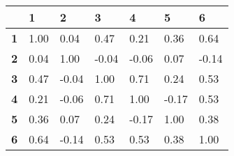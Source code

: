 \begin{tabular}{lllllll}

&\textbf{1}&\textbf{2}&\textbf{3}&\textbf{4}&\textbf{5}&\textbf{6}\\\hline
\textbf{1}&1.00&0.04&0.47&0.21&0.36&0.64\\
\textbf{2}&0.04&1.00&-0.04&-0.06&0.07&-0.14\\
\textbf{3}&0.47&-0.04&1.00&0.71&0.24&0.53\\
\textbf{4}&0.21&-0.06&0.71&1.00&-0.17&0.53\\
\textbf{5}&0.36&0.07&0.24&-0.17&1.00&0.38\\
\textbf{6}&0.64&-0.14&0.53&0.53&0.38&1.00\\
\end{tabular}
